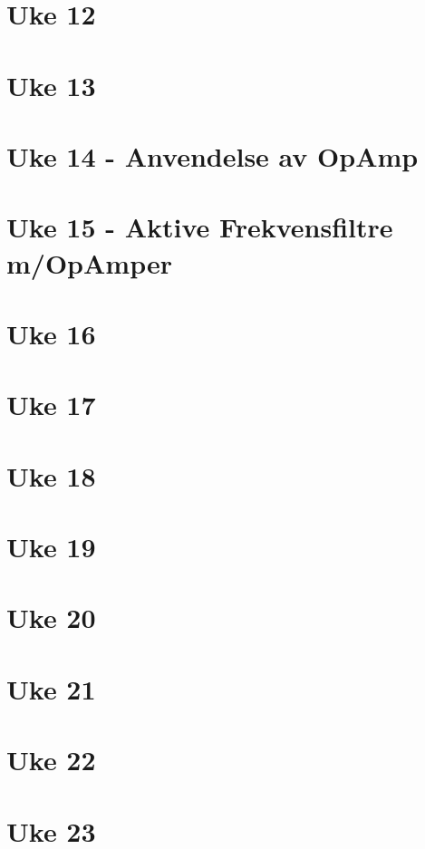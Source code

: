 \documentclass{article}
\begin{document}
  \section{Uke 12}
    
  \section{Uke 13}
    
  \section{Uke 14 - Anvendelse av OpAmp}
    
  \section{Uke 15 - Aktive Frekvensfiltre m/OpAmper}
    
  \section{Uke 16}
  \section{Uke 17}
  \section{Uke 18}
  \section{Uke 19}
  \section{Uke 20}
  \section{Uke 21}
  \section{Uke 22}
  \section{Uke 23}
\end{document}
